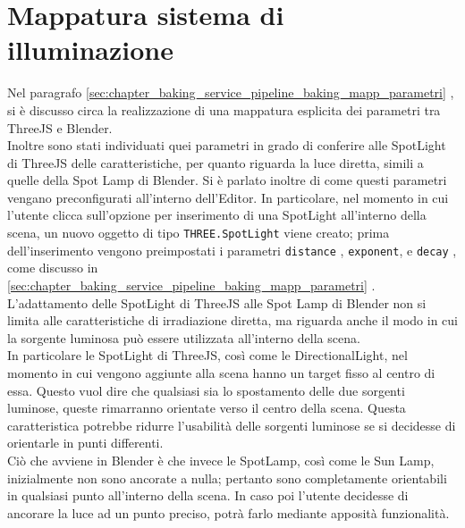 \section{Mappatura sistema di illuminazione}
\label{sec:chapter_creazione_scena_mapping_illuminazione}
Nel paragrafo \ref{sec:chapter_baking_service_pipeline_baking_mapp_parametri} , si è discusso circa la realizzazione di una mappatura esplicita dei parametri tra ThreeJS e Blender. 
\\
Inoltre sono stati individuati quei parametri in grado di conferire alle SpotLight di ThreeJS delle caratteristiche, per quanto riguarda la luce diretta, simili a quelle della Spot Lamp di Blender. Si è parlato inoltre di come questi parametri vengano preconfigurati all’interno dell’Editor. In particolare, nel momento in cui l’utente clicca sull’opzione per inserimento di una SpotLight all’interno della scena, un nuovo oggetto di tipo \texttt{THREE.SpotLight} viene creato; prima dell’inserimento vengono preimpostati i parametri \texttt{distance} , \texttt{exponent}, e \texttt{decay} , come discusso in \ref{sec:chapter_baking_service_pipeline_baking_mapp_parametri} .
\\ 
L’adattamento delle SpotLight di ThreeJS alle Spot Lamp di Blender non si limita alle caratteristiche di irradiazione diretta, ma riguarda anche il modo in cui la sorgente luminosa può essere utilizzata all’interno della scena. 
\\
In particolare le SpotLight di ThreeJS, così come le DirectionalLight, nel momento in cui vengono aggiunte alla scena hanno un target fisso al centro di essa. Questo vuol dire che qualsiasi sia lo spostamento delle due sorgenti luminose, queste rimarranno orientate verso il centro della scena. Questa caratteristica potrebbe ridurre l’usabilità delle sorgenti luminose se si decidesse di orientarle in punti differenti.
\\ 
Ciò che avviene in Blender è che invece le SpotLamp, così come le Sun Lamp, inizialmente non sono ancorate a nulla; pertanto sono completamente orientabili in qualsiasi punto all’interno della scena. In caso poi l’utente decidesse di ancorare la luce ad un punto preciso, potrà farlo mediante apposità funzionalità.
\\
